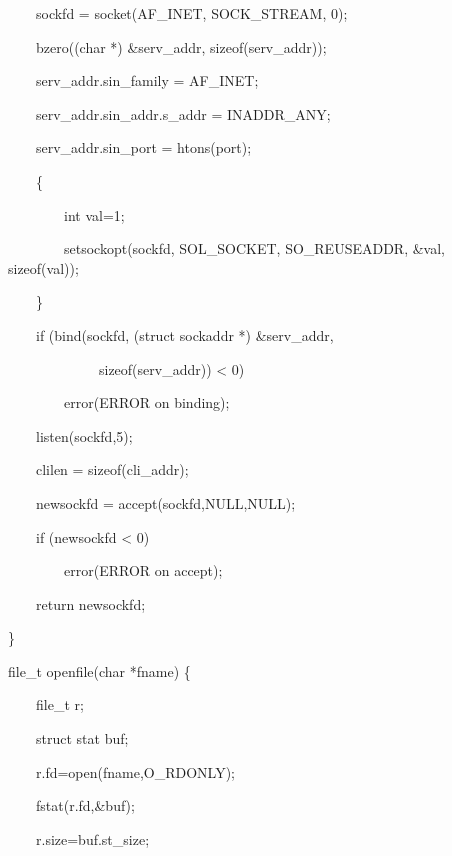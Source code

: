 \documentclass[a4paper,11pt]{article}
\begin{document}
\bigskip

{\ttfamily
\ \ \ \ sockfd = socket(AF\_INET, SOCK\_STREAM, 0);}

{\ttfamily
\ \ \ \ bzero((char *) \&serv\_addr, sizeof(serv\_addr));}


\bigskip

{\ttfamily
\ \ \ \ serv\_addr.sin\_family = AF\_INET;}

{\ttfamily
\ \ \ \ serv\_addr.sin\_addr.s\_addr = INADDR\_ANY;}

{\ttfamily
\ \ \ \ serv\_addr.sin\_port = htons(port);}

{\ttfamily
\ \ \ \ \{}

{\ttfamily
\ \ \ \ \ \ \ \ int val=1;}

{\ttfamily
\ \ \ \ \ \ \ \ setsockopt(sockfd, SOL\_SOCKET, SO\_REUSEADDR, \&val,
sizeof(val));}

{\ttfamily
\ \ \ \ \}}

{\ttfamily
\ \ \ \ if (bind(sockfd, (struct sockaddr *) \&serv\_addr,}

{\ttfamily
\ \ \ \ \ \ \ \ \ \ \ \ \ sizeof(serv\_addr)) {\textless} 0)}

{\ttfamily
\ \ \ \ \ \ \ \ error({\textquotedbl}ERROR on binding{\textquotedbl});}

{\ttfamily
\ \ \ \ listen(sockfd,5);}

{\ttfamily
\ \ \ \ clilen = sizeof(cli\_addr);}

{\ttfamily
\ \ \ \ newsockfd = accept(sockfd,NULL,NULL);}

{\ttfamily
\ \ \ \ if (newsockfd {\textless} 0)}

{\ttfamily
\ \ \ \ \ \ \ \ error({\textquotedbl}ERROR on accept{\textquotedbl});}

{\ttfamily
\ \ \ \ return newsockfd;}

{\ttfamily
\}}


\bigskip

{\ttfamily
file\_t openfile(char *fname) \{}

{\ttfamily
\ \ \ \ file\_t r;}

{\ttfamily
\ \ \ \ struct stat buf;}


\bigskip

{\ttfamily
\ \ \ \ r.fd=open(fname,O\_RDONLY);}


\bigskip

{\ttfamily
\ \ \ \ fstat(r.fd,\&buf);}


\bigskip

{\ttfamily
\ \ \ \ r.size=buf.st\_size;}
\end{document}

